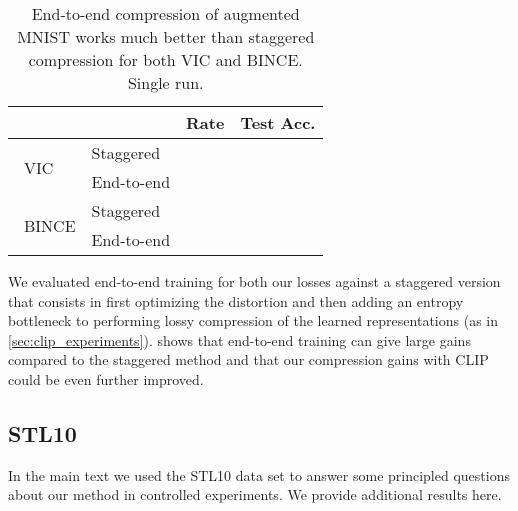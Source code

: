 \documentclass[final]{article}
\begin{document}
\begin{table}[h]
\caption{
End-to-end compression of augmented MNIST works much better than staggered compression for both VIC and BINCE. Single run.
}
\small
\center
\begin{tabular}{llrr}
\toprule
&& Rate  & Test Acc.   \\ 
\midrule 
\multirow{2}{*}{\centering  ~VIC } 
 & Staggered  &    &    \\ 
  & End-to-end &    &   \\  
\midrule 
\multirow{2}{*}{\centering  ~BINCE  }
 & Staggered &    &   \\
   & End-to-end &    &    \\ 
\bottomrule
\end{tabular}
\label{table:end2end}
\end{table} 

We evaluated end-to-end training for both our losses against a staggered version that consists in first optimizing the distortion and then adding an entropy bottleneck to performing lossy compression of the learned representations (as in \cref{sec:clip_experiments}).
 shows that end-to-end training can give large gains compared to the staggered method and that our compression gains with CLIP could be even further improved.


\subsection{STL10}
\label{appx:stl10}
In the main text we used the STL10 data set to answer some principled questions about our method in controlled experiments.
We provide additional results here.
\end{document}
